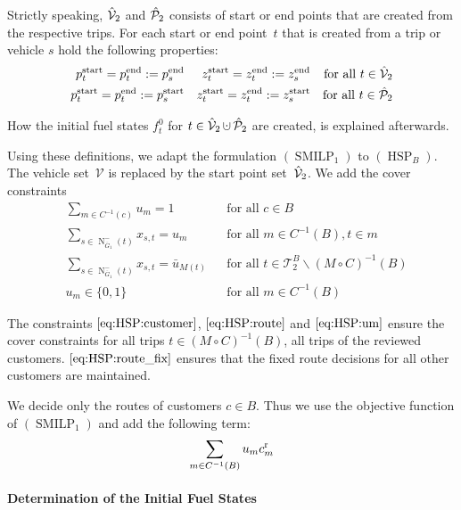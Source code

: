Strictly speaking, $\hat{\mathcal{V}}_2$ and $\hat{\mathcal{P}}_2$ consists of start or end points that are created from the respective trips. For each start or end point~$t$ that is created from a trip or vehicle $s$ hold the following properties:
\begin{align*}
	p^{\operatorname{start}}_t = p^{\operatorname{end}}_t := p^{\operatorname{end}}_s && z^{\operatorname{start}}_t = z^{\operatorname{end}}_t := z^{\operatorname{end}}_s && \text{for all } t\in\hat{\mathcal{V}}_2 \\
	p^{\operatorname{start}}_t = p^{\operatorname{end}}_t := p^{\operatorname{start}}_s && z^{\operatorname{start}}_t = z^{\operatorname{end}}_t := z^{\operatorname{start}}_s && \text{for all } t\in\hat{\mathcal{P}}_2
\end{align*}

How the initial fuel states $f^0_t$ for ${t\in\Vhat_2\cupdot\Phat_2}$ are created, is explained afterwards.

Using these definitions, we adapt the formulation $(\operatorname{SMILP}_1)$ to $(\operatorname{HSP}_B)$. The vehicle set~$\mathcal{V}$ is replaced by the start point set~$\hat{\mathcal{V}}_2$. We add the cover constraints
\begin{align}
	& \sum_{m\in C^{-1}(c)} u_m = 1 && \text{for all } c\in B \label{eq:HSP:customer} \\
	& \sum_{s\in\operatorname{N}_{\overline{G}_1}^-(t)} x_{s,t} = u_m && \text{for all } m\in C^{-1}(B),t\in m \label{eq:HSP:route} \\
	& \sum_{s\in\operatorname{N}_{\overline{G}_1}^-(t)} x_{s,t} = \bar{u}_{M(t)} && \text{for all } t\in\mathcal{T}^B_2\backslash(M\circ C)^{-1}(B) \label{eq:HSP:route_fix} \\
	& u_m\in\{0,1\} && \text{for all } m\in C^{-1}(B) \label{eq:HSP:um}
\end{align}

The constraints $\eqref{eq:HSP:customer}$, $\eqref{eq:HSP:route}$ and $\eqref{eq:HSP:um}$ ensure the cover constraints for all trips ${t\in(M\circ C)^{-1}(B)}$, \ie all trips of the reviewed customers. $\eqref{eq:HSP:route_fix}$ ensures that the fixed route decisions for all other customers are maintained. 

We decide only the routes of customers ${c\in B}$. Thus we use the objective function of $(\operatorname{SMILP}_1)$ and add the following term:
\begin{align*}
	\sum_{m\in C^{-1}(B)} u_m c^{\operatorname{r}}_m
\end{align*}

\paragraph{Determination of the Initial Fuel States} \parfill

